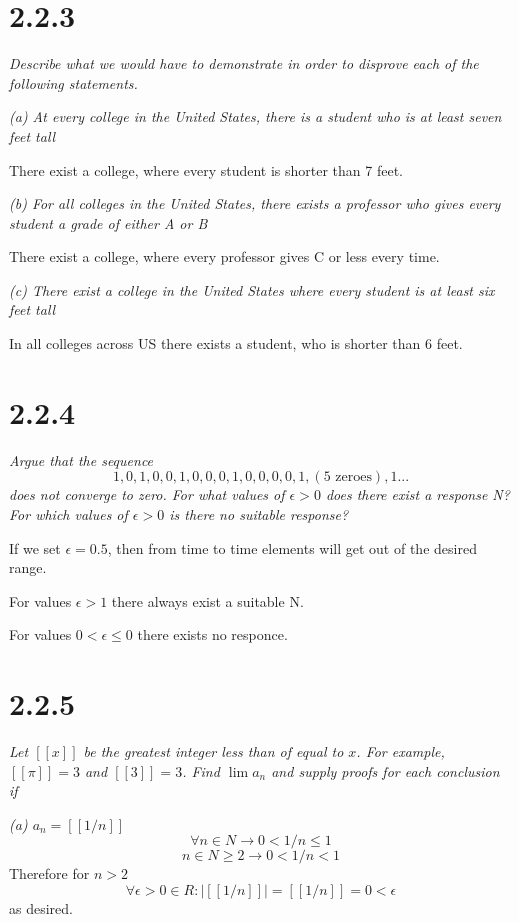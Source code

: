 \documentclass[11pt,oneside,titlepage]{book}
\begin{document}
\section*{2.2.3}
\textit{Describe what we would have to demonstrate in order to disprove each
  of the following statements.}

\textit{(a) At every college in the United States, there is a student who is at least
  seven feet tall}

There exist a college, where every student is shorter than 7 feet.

\textit{(b) For all colleges in the United States, there exists a professor who
  gives every student a grade of either A or B}

There exist a college, where every professor gives C or less every time.

\textit{(c) There exist a college in the United States where every student is at least
  six feet tall}

In all colleges across US there exists a student, who is shorter than 6 feet.

\section*{2.2.4}
\textit{Argue that the sequence }
$$1, 0, 1, 0, 0, 1, 0, 0, 0, 1, 0, 0, 0, 0, 1, (\text{5 zeroes}), 1...$$
\textit{
  does not converge to zero. For what values of $\epsilon > 0$ does there exist a response
  N? For which values of $\epsilon > 0$ is there no suitable response?}

If we set $\epsilon = 0.5$, then from time to time elements will get out of
the desired range.

For values $\epsilon > 1$ there always exist a suitable N.

For values $ 0 < \epsilon \leq 0$ there exists no responce.

\section*{2.2.5}
\textit{Let $[[x]]$ be the greatest integer less than of equal to $x$. For example,
  $[[\pi]] = 3$ and $[[3]] = 3$. Find $\lim a_n$ and supply proofs for each conclusion
  if}

\textit{(a) $a_n = [[1/n]]$}
$$\forall n \in N \to 0  < 1/n \leq 1$$
$$n \in N \geq 2 \to  0  < 1/n < 1$$
Therefore for $n > 2$
$$\forall \epsilon > 0 \in R: |[[1/n]]| = [[1/n]] = 0 < \epsilon$$
as desired.
\end{document}
